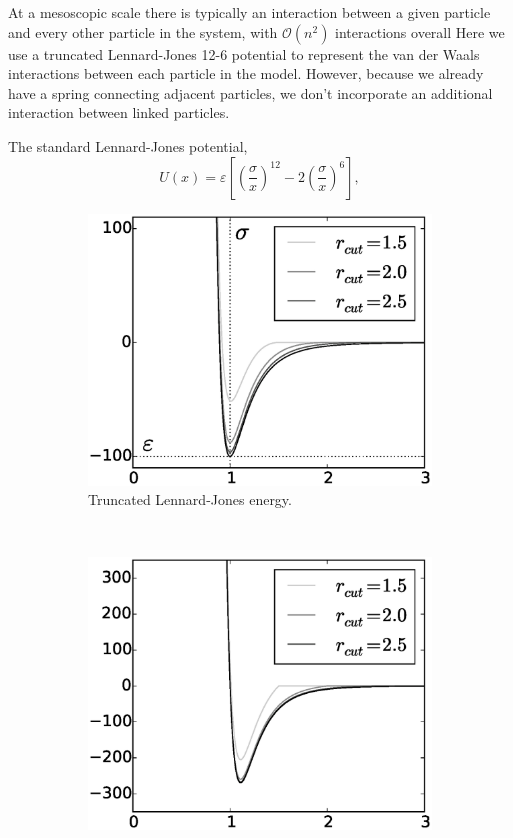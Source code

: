 	At a mesoscopic scale there is typically an interaction between a given particle and every other particle in the system, with $\mathcal{O}(n^2)$ interactions overall Here we use a truncated Lennard-Jones 12-6 potential to represent the van der Waals interactions between each particle in the model. However, because we already have a spring connecting adjacent particles, we don't incorporate an additional interaction between linked particles.
	
The standard Lennard-Jones potential,
\begin{equation}
	U(x) = \varepsilon \left[ \left( \frac{\sigma}{x} \right)^{12} - 2 \left( \frac{\sigma}{x} \right)^6 \right],
\end{equation}

	\begin{figure}[t!]
		\centering
		\begin{subfigure}[t]{.5\textwidth}
			\centering
			\includegraphics[scale=.5]{./fig/ch2/ljc_e.eps}
			\caption{Truncated Lennard-Jones energy. \label{subfig:LJTEnergy}}
		\end{subfigure}%
		~
		\begin{subfigure}[t]{.5\textwidth}
			\centering
			\includegraphics[scale=.5]{./fig/ch2/ljc_f.eps}

\end{subfigure}
\end{figure}
